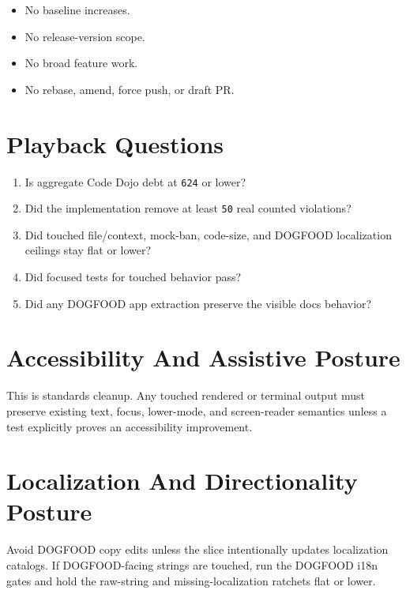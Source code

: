 \begin{itemize}
\tightlist
\item
  No baseline increases.
\item
  No release-version scope.
\item
  No broad feature work.
\item
  No rebase, amend, force push, or draft PR.
\end{itemize}

\section{Playback Questions}\label{record-237-playback-questions}

\begin{enumerate}
\def\labelenumi{\arabic{enumi}.}
\tightlist
\item
  Is aggregate Code Dojo debt at \texttt{6\allowbreak{}2\allowbreak{}4} or lower?
\item
  Did the implementation remove at least \texttt{5\allowbreak{}0} real counted violations?
\item
  Did touched file/context, mock-ban, code-size, and DOGFOOD localization ceilings stay flat or lower?
\item
  Did focused tests for touched behavior pass?
\item
  Did any DOGFOOD app extraction preserve the visible docs behavior?
\end{enumerate}

\section{Accessibility And Assistive Posture}\label{record-237-accessibility-and-assistive-posture}

This is standards cleanup. Any touched rendered or terminal output must preserve existing text, focus, lower-mode, and screen-reader semantics unless a test explicitly proves an accessibility improvement.

\section{Localization And Directionality Posture}\label{record-237-localization-and-directionality-posture}

Avoid DOGFOOD copy edits unless the slice intentionally updates localization catalogs. If DOGFOOD-facing strings are touched, run the DOGFOOD i18n gates and hold the raw-string and missing-localization ratchets flat or lower.

